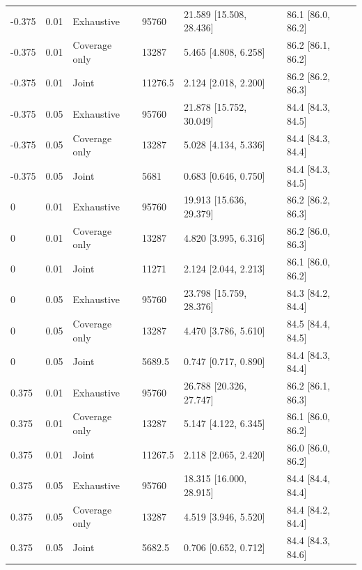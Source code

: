\begin{tabular}{llllll}
-0.375 & 0.01 & Exhaustive & 95760 & 21.589 [15.508, 28.436] & 86.1 [86.0, 86.2] \\
-0.375 & 0.01 & Coverage only & 13287 & 5.465 [4.808, 6.258] & 86.2 [86.1, 86.2] \\
-0.375 & 0.01 & Joint & 11276.5 & 2.124 [2.018, 2.200] & 86.2 [86.2, 86.3] \\
-0.375 & 0.05 & Exhaustive & 95760 & 21.878 [15.752, 30.049] & 84.4 [84.3, 84.5] \\
-0.375 & 0.05 & Coverage only & 13287 & 5.028 [4.134, 5.336] & 84.4 [84.3, 84.4] \\
-0.375 & 0.05 & Joint & 5681 & 0.683 [0.646, 0.750] & 84.4 [84.3, 84.5] \\
0 & 0.01 & Exhaustive & 95760 & 19.913 [15.636, 29.379] & 86.2 [86.2, 86.3] \\
0 & 0.01 & Coverage only & 13287 & 4.820 [3.995, 6.316] & 86.2 [86.0, 86.3] \\
0 & 0.01 & Joint & 11271 & 2.124 [2.044, 2.213] & 86.1 [86.0, 86.2] \\
0 & 0.05 & Exhaustive & 95760 & 23.798 [15.759, 28.376] & 84.3 [84.2, 84.4] \\
0 & 0.05 & Coverage only & 13287 & 4.470 [3.786, 5.610] & 84.5 [84.4, 84.5] \\
0 & 0.05 & Joint & 5689.5 & 0.747 [0.717, 0.890] & 84.4 [84.3, 84.4] \\
0.375 & 0.01 & Exhaustive & 95760 & 26.788 [20.326, 27.747] & 86.2 [86.1, 86.3] \\
0.375 & 0.01 & Coverage only & 13287 & 5.147 [4.122, 6.345] & 86.1 [86.0, 86.2] \\
0.375 & 0.01 & Joint & 11267.5 & 2.118 [2.065, 2.420] & 86.0 [86.0, 86.2] \\
0.375 & 0.05 & Exhaustive & 95760 & 18.315 [16.000, 28.915] & 84.4 [84.4, 84.4] \\
0.375 & 0.05 & Coverage only & 13287 & 4.519 [3.946, 5.520] & 84.4 [84.2, 84.4] \\
0.375 & 0.05 & Joint & 5682.5 & 0.706 [0.652, 0.712] & 84.4 [84.3, 84.6] \\
\end{tabular}

